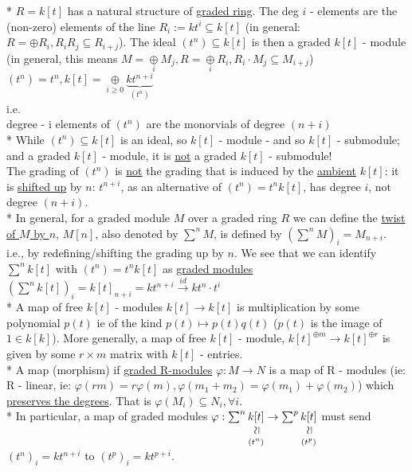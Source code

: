 \documentclass[11pt,a4paper]{report}
\newcommand{\vertsimeq}{\rotatebox{90}{$\,\simeq$}}
\newcommand{\simequalto}[2]{\underset{\scriptstyle\overset{\mkern4mu\vertsimeq}{#2}}{#1}}
\begin{document}
              * $R = k[t]$ has a natural structure of \underline{graded ring}. The deg $i$ - elements are the (non-zero) elements of the line $R_i := kt^i \subseteq k[t]$ (in general: $R = \oplus R_i, R_iR_j \subseteq R_{i+j}$).
              The ideal $(t^n) \subseteq k[t]$ is then a graded $k[t]$ - module (in general, this means $M = \underset{i}{\oplus} M_j, R = \underset{i}{\oplus} R_i, R_i \cdot M_j \subseteq M_{i+j}$) $(t^n) = t^n, k[t] = \underset{i \ge 0}{\oplus} \underbrace{kt^{n+i}}_{(t^{n})}$\\
              i.e.\\
              degree - i elements of $(t^n)$ are the monorvials of degree $(n+i)$\\
              * While $(t^n) \subseteq k[t]$ is an ideal, so $k[t]$ - module - and so $k[t]$ - submodule; and a graded $k[t]$ - module, it is \underline{not} a graded $k[t]$ - submodule!\\
              The grading of $(t^n)$ is \underline{not} the grading that is induced by the \underline{ambient} $k[t]$: it is \underline{shifted up} by $n$: $t^{n+i}$, as an alternative of $(t^n) = t^nk[t]$, has degree $i$, not degree $(n+i)$.\\
              * In general, for a graded module $M$ over a graded ring $R$ we can define the \underline{twist of $M$ by $n$}, $M[n]$, also denoted by $\sum^nM$, is defined by $(\sum^nM)_i = M_{n+i}$.\\
              i.e., by redefining/shifting the grading up by $n$. We see that we can identify $\sum^nk[t]$ with $(t^n) = t^nk[t]$ as \underline{graded modules} $(\sum^nk[t])_i = k[t]_{n+i} = kt^{n+i} \xrightarrow{id} kt^n\cdot t^i$\\
              * A map of free $k[t]$ - modules $k[t] \rightarrow k[t]$ is multiplication by some polynomial $p(t)$ ie of the kind $p(t) \mapsto p(t)q(t)$ ($p(t)$ is the image of $1 \in k[k]$). More generally, a map of free $k[t]$ - module, $k[t]^{\oplus m} \rightarrow k[t]^{\oplus r}$ is given by some $r \times m$ matrix with $k[t]$ - entries.\\
              * A map (morphism) if \underline{graded R-modules} $\varphi: M \rightarrow N$ is a map of R - modules (ie: R - linear, ie: $\varphi(rm) = r \varphi(m), \varphi(m_1 + m_2) = \varphi(m_1) + \varphi(m_2)$) which \underline{preserves the degrees}. That is $\varphi(M_i) \subseteq N_i, \forall i$.\\
              * In particular, a map of graded modules $\varphi: \sum^n\simequalto{k[t]}{(t^n)} \rightarrow \sum^p\simequalto{k[t]}{(t^p)}$ must send $(t^n)_i = kt^{n+i}$ to $(t^p)_i = kt^{p+i}$.\\
\end{document}
